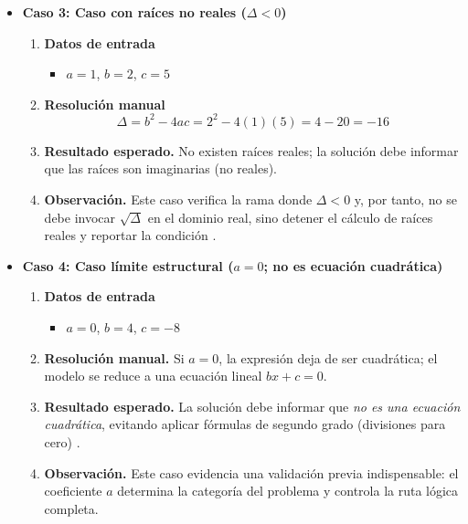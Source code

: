 \documentclass[12pt,twoside]{book}
\begin{document}
\begin{itemize}
							\item \textbf{Caso 3: Caso con raíces no reales ($\Delta<0$)}
							
							\begin{enumerate}
								\item \textbf{Datos de entrada}
								\begin{itemize}
									\item $a=1$, $b=2$, $c=5$
								\end{itemize}
								\item \textbf{Resolución manual}
								\[
								\Delta=b^2-4ac=2^2-4(1)(5)=4-20=-16
								\]
								\item \textbf{Resultado esperado.} No existen raíces reales; la solución debe informar que las raíces son imaginarias (no reales).
								\item \textbf{Observación.} Este caso verifica la rama donde $\Delta<0$ y, por tanto, no se debe invocar $\sqrt{\Delta}$ en el dominio real, sino detener el cálculo de raíces reales y reportar la condición \cite{Joyanes2007Fundamentos}.
							\end{enumerate}
							
							\item \textbf{Caso 4: Caso límite estructural ($a=0$; no es ecuación cuadrática)}
							
							\begin{enumerate}
								\item \textbf{Datos de entrada}
								\begin{itemize}
									\item $a=0$, $b=4$, $c=-8$
								\end{itemize}
								\item \textbf{Resolución manual.} Si $a=0$, la expresión deja de ser cuadrática; el modelo se reduce a una ecuación lineal $bx+c=0$.
								\item \textbf{Resultado esperado.} La solución debe informar que \emph{no es una ecuación cuadrática}, evitando aplicar fórmulas de segundo grado (divisiones para cero) \cite{Gaddis2022Starting,Farrell2018Programming}.
								\item \textbf{Observación.} Este caso evidencia una validación previa indispensable: el coeficiente $a$ determina la categoría del problema y controla la ruta lógica completa.
							\end{enumerate}
							

\end{itemize}
\end{document}
